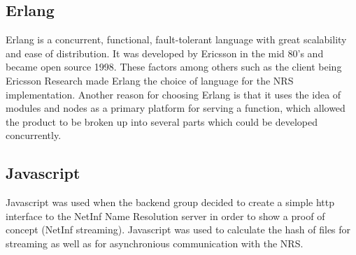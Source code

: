 \subsection{Erlang}
Erlang is a concurrent, functional, fault-tolerant language with great scalability and ease of distribution. It was developed by Ericsson in the mid 80's and became open source 1998.\cite{otpInAction} These factors among others such as the client being Ericsson Research made Erlang the choice of language for the NRS implementation.
Another reason for choosing Erlang is that it uses the idea of modules and nodes as a primary platform for serving a function, which allowed the product to be broken up into several parts which could be developed concurrently.
\subsection{Javascript}
Javascript was used when the backend group decided to create a simple http interface to the NetInf Name Resolution server in order to show a proof of concept (NetInf streaming). Javascript was used to calculate the hash of files for streaming as well as for asynchronious communication with the NRS.
